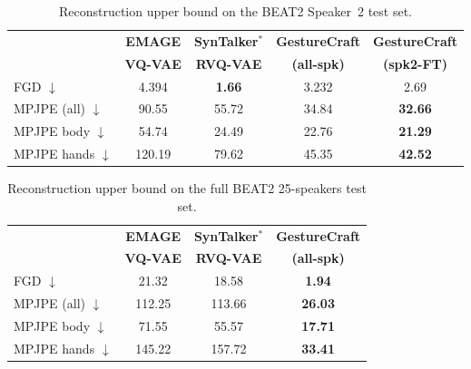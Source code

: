 \begin{table}[t]
\scriptsize
\caption{Reconstruction upper bound on the BEAT2 Speaker~2 test set.}
\label{tab:recon_spk2}
\begin{tabular}{lcccc}
\toprule
 & \textbf{EMAGE} & \textbf{SynTalker$^*$} & \textbf{GestureCraft} & \textbf{GestureCraft} \\
 & \textbf{VQ-VAE} & \textbf{RVQ-VAE}      & \textbf{(all-spk)} & \textbf{(spk2-FT)}   \\
\midrule
FGD $\downarrow$         & 4.394 & \textbf{1.66} & 3.232 & 2.69 \\
MPJPE (all) $\downarrow$ & 90.55 & 55.72 & 34.84 & \textbf{32.66} \\
MPJPE body $\downarrow$  & 54.74 & 24.49 & 22.76 & \textbf{21.29} \\
MPJPE hands $\downarrow$ & 120.19 & 79.62 & 45.35 & \textbf{42.52} \\
\bottomrule
\end{tabular}
\end{table}

\begin{table}[t]
\scriptsize
\caption{Reconstruction upper bound on the full BEAT2 25-speakers test
  set.}%
\label{tab:recon_allspk}
\begin{tabular}{lccc}
\toprule
 & \textbf{EMAGE} & \textbf{SynTalker$^*$} & \textbf{GestureCraft} \\
 & \textbf{VQ-VAE} & \textbf{RVQ-VAE} & \textbf{(all-spk)} \\
\midrule
FGD $\downarrow$         & 21.32  & 18.58  & \textbf{1.94} \\
MPJPE (all) $\downarrow$ & 112.25 & 113.66 & \textbf{26.03} \\
MPJPE body $\downarrow$  & 71.55  & 55.57  & \textbf{17.71} \\
MPJPE hands $\downarrow$ & 145.22 & 157.72 & \textbf{33.41} \\
\bottomrule
\end{tabular}
\end{table}

